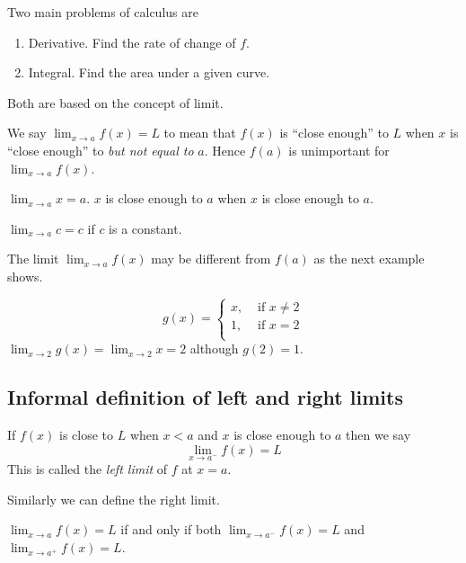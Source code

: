 \documentclass[../main.tex]{subfiles}
\begin{document}
Two main problems of calculus are
\begin{enumerate}
  \item Derivative. Find the rate of change of $f$.
  \item Integral. Find the area under a given curve.
\end{enumerate}
Both are based on the concept of limit.

We say $\lim_{x \to a} f(x) = L$ to mean that $f(x)$ is ``close enough'' to $L$ when $x$ is ``close enough'' to \emph{but not equal to} $a$. Hence $f(a)$ is unimportant for $\lim_{x \to a} f(x)$.

\begin{example}
  $\lim_{x \to a} x = a$. $x$ is close enough to $a$ when $x$ is close enough to $a$.
\end{example}

\begin{example}
  $\lim_{x \to a} c = c$ if $c$ is a constant.
\end{example}

The limit $\lim_{x \to a} f(x)$ may be different from $f(a)$ as the next example shows.
\begin{example}
  \[
    g(x) =
    \begin{cases}
      x, &\text{ if } x\neq 2\\
      1, &\text{ if } x = 2\\
    \end{cases}
  \]
  $\lim_{x \to 2} g(x) = \lim_{x \to 2} x = 2$ although $g(2) = 1$.
\end{example}

\subsection*{Informal definition of left and right limits}
If $f(x)$ is close to $L$ when $x<a$ and $x$ is close enough to $a$ then we say
\[
  \lim_{x \to a^{-}} f(x) = L
\]
This is called the \emph{left limit} of $f$ at $x=a$.

Similarly we can define the right limit.

\begin{theorem}
  $\lim_{x \to a} f(x) = L$ if and only if both $\lim_{x \to a^{-}} f(x) =L$ and $\lim_{x \to a^{+}} f(x) = L$.
\end{theorem}
\end{document}
